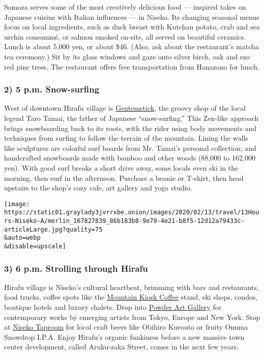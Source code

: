 Somoza serves some of the most creatively delicious food --- inspired
takes on Japanese cuisine with Italian influences --- in Niseko. Its
changing seasonal menus focus on local ingredients, such as duck breast
with Kutchan potato, crab and sea urchin consommé, or salmon smoked
on-site, all served on beautiful ceramics. Lunch is about 5,000 yen, or
about \$46. (Also, ask about the restaurant's matcha tea ceremony.) Sit
by its glass windows and gaze onto silver birch, oak and ezo red pine
trees. The restaurant offers free transportation from Hanazono for
lunch.

\hypertarget{2-5-pm-snow-surfing}{%
\subsubsection{2) 5 p.m. Snow-surfing}\label{2-5-pm-snow-surfing}}

West of downtown Hirafu village is
\href{http://www.Gentemstick.com}{Gentemstick}, the groovy shop of the
local legend Taro Tamai, the father of Japanese ``snow-surfing.'' This
Zen-like approach brings snowboarding back to its roots, with the rider
using body movements and techniques from surfing to follow the terrain
of the mountain. Lining the walls like sculptures are colorful surf
boards from Mr. Tamai's personal collection, and handcrafted snowboards
made with bamboo and other woods (88,000 to 162,000 yen). With good surf
breaks a short drive away, some locals even ski in the morning, then
surf in the afternoon. Purchase a beanie or T-shirt, then head upstairs
to the shop's cozy cafe, art gallery and yoga studio.

\texttt{[image: https://static01.graylady3jvrrxbe.onion/images/2020/02/13/travel/13Hours-Niseko-A/merlin\_167827839\_86b183b8-9e79-4e21-b8f5-12d12a79433c-articleLarge.jpg?quality=75\\\&auto=webp\\\&disable=upscale]}

\hypertarget{3-6-pm-strolling-through-hirafu}{%
\subsubsection{3) 6 p.m. Strolling through
Hirafu}\label{3-6-pm-strolling-through-hirafu}}

Hirafu village is Niseko's cultural heartbeat, brimming with bars and
restaurants, food trucks, coffee spots like the
\href{https://www.mountainkioskcoffee.com/}{Mountain Kiosk Coffee}
stand, ski shops, condos, boutique hotels and luxury chalets. Drop into
\href{http://www.powderart.net}{Powder Art Gallery} for contemporary
works by emerging artists from Tokyo, Europe and New York. Stop at
\href{http://nisekotaproom.com}{Niseko Taproom} for local craft beers
like Obihiro Kurouto or fruity Onuma Snowdrop I.P.A. Enjoy Hirafu's
organic funkiness before a new massive town center development, called
Aruku-zaka Street, comes in the next few years.

